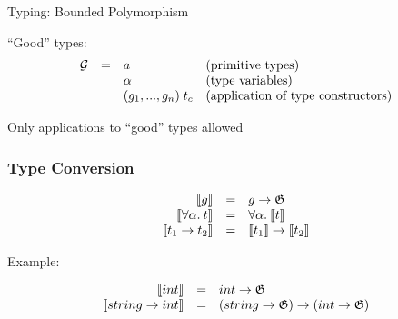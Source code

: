 \documentclass{beamer}
\let\\\tabularnewline
\let\\\tabularnewline
\newcommand{\goal}{\mathfrak G}
\newcommand{\inmath}[1]{\mbox{$#1$}}
\newcommand{\sembr}[1]{\llbracket{#1}\rrbracket}
\theoremstyle{definition}
\begin{document}
\begin{frame}[fragile]{Typing: Bounded Polymorphism}
\begin{center}
``Good'' types:
\vskip2mm
$$
\begin{array}{rcll}
  \mathcal G &\mathrel{{=}}&a                        &\mbox{(primitive types)}\\ 
             &             &\alpha                   &\mbox{{(type variables)}}                   \\
             &             & (g_1, ..., g_n) \; t_c   &\mbox{{(application of type constructors)}} \\
\end{array}
$$

\vskip1cm
Only applications to ``good'' types allowed
\end{center}

\end{frame}

\begin{frame}\frametitle{Type Conversion}
$$
\begin{array}{rcl}
\sembr{g}                     & = & g \to \goal \\
\sembr{\forall \alpha. \: t} & = & \forall \alpha. \: \sembr{t} \\
\sembr{t_1 \to t_2}  & = & \sembr{t_1} \to \sembr{t_2} \\
\end{array}
$$
\vskip2mm
\pause
\begin{center}
Example:
\end{center}
$$
\begin{array}{rcl}
\inmath{\sembr{int}}           & = & \inmath{int} \to \goal \\
\inmath{\sembr{string\to int}} & = & (\inmath{string} \to \goal) \to (\inmath{int} \to \goal)
\end{array}
$$
\end{frame}
\end{document}
